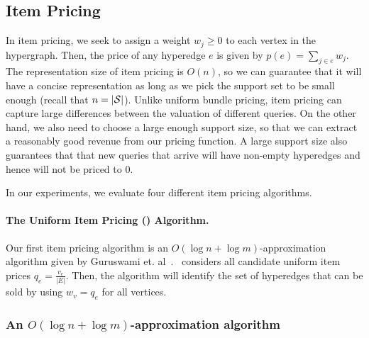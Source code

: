 
\subsection{Item Pricing} 

In item pricing, we seek to assign a weight $w_j \geq 0$ to each vertex in the hypergraph. 
Then, the price of any hyperedge $e$ is given by $p(e) = \sum_{j \in e} w_j$. The representation size of item pricing is $O(n)$, so we can guarantee that it will have a 
concise representation as long as we pick the support set to be small enough (recall that $n = |\mathcal{S}|$). Unlike uniform bundle pricing, item pricing can capture large differences between
the valuation of different queries. On the other hand, we also need to choose a large enough support size, so that we can extract a reasonably good revenue from our pricing
function. A large support size also guarantees that that new queries that arrive will have
non-empty hyperedges and hence will not be priced to 0. 


In our experiments, we evaluate four different item pricing algorithms.

\paragraph{The Uniform Item Pricing (\uip) Algorithm.}
Our first item pricing algorithm is an $O(\log n + \log m)$-approximation algorithm given by Guruswami et. al~\cite{guruswami2005profit}. \uip\ considers all candidate uniform item prices $q_e = \frac{v_e}{|E|}$. Then, the algorithm will identify the set of hyperedges that can be sold by using $w_v = q_e$ for all vertices.

\subsubsection{An $O(\log n+\log m)$-approximation algorithm}

